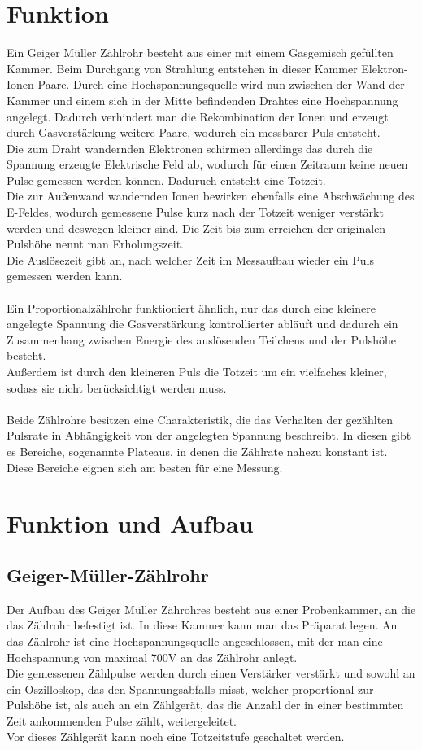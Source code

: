\documentclass[12pt,a4paper]{article}
\begin{document}
\section{Funktion}
Ein Geiger Müller Zählrohr besteht aus einer mit einem Gasgemisch gefüllten Kammer. Beim Durchgang von Strahlung entstehen in dieser Kammer Elektron-Ionen Paare. Durch eine  Hochspannungsquelle wird nun zwischen der Wand der Kammer und einem sich in der Mitte befindenden Drahtes eine Hochspannung angelegt. Dadurch verhindert man die Rekombination der Ionen und erzeugt durch Gasverstärkung weitere Paare, wodurch ein messbarer Puls entsteht.\\
Die zum Draht wandernden Elektronen schirmen allerdings das durch die Spannung erzeugte Elektrische Feld ab, wodurch für einen Zeitraum keine neuen Pulse gemessen werden können. Daduruch entsteht eine Totzeit.\\
Die zur Außenwand wandernden Ionen bewirken ebenfalls eine Abschwächung des E-Feldes, wodurch gemessene Pulse kurz nach der Totzeit weniger verstärkt werden und deswegen kleiner sind. Die Zeit bis zum erreichen der originalen Pulshöhe nennt man Erholungszeit.\\
Die Auslösezeit gibt an, nach welcher Zeit im Messaufbau wieder ein Puls gemessen werden kann.\\
\\
Ein Proportionalzählrohr funktioniert ähnlich, nur das durch eine kleinere angelegte Spannung die Gasverstärkung kontrollierter abläuft und dadurch ein Zusammenhang zwischen Energie des auslösenden Teilchens und der Pulshöhe besteht.\\
Außerdem ist durch den kleineren Puls die Totzeit um ein vielfaches kleiner, sodass sie nicht berücksichtigt werden muss.\\
\\
Beide Zählrohre besitzen eine Charakteristik, die das Verhalten der gezählten Pulsrate in Abhängigkeit von der angelegten Spannung beschreibt. In diesen gibt es Bereiche, sogenannte Plateaus, in denen die Zählrate nahezu konstant ist. Diese Bereiche eignen sich am besten für eine Messung.

\section{Funktion und Aufbau}
\subsection{Geiger-Müller-Zählrohr}
Der Aufbau des Geiger Müller Zährohres besteht aus einer Probenkammer, an die das Zählrohr befestigt ist. In diese Kammer kann man das Präparat legen. An das Zählrohr ist eine Hochspannungsquelle angeschlossen, mit der man eine Hochspannung von maximal 700V an das Zählrohr anlegt.\\
Die gemessenen Zählpulse werden durch einen Verstärker verstärkt und sowohl an ein Oszilloskop, das den Spannungsabfalls misst, welcher proportional zur Pulshöhe ist, als auch an ein Zählgerät, das die Anzahl der in einer bestimmten Zeit ankommenden Pulse zählt, weitergeleitet.\\
Vor dieses Zählgerät kann noch eine Totzeitstufe geschaltet werden.
\end{document}
